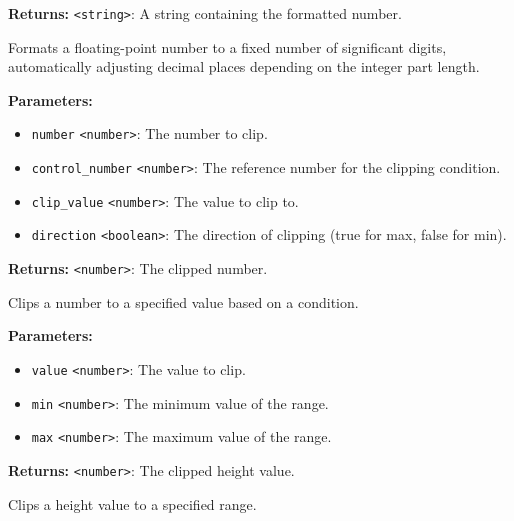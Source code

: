 \documentclass[12pt,a4paper]{article}
\begin{document}
\noindent \textbf{Returns:} \texttt{<string>}: A string containing the formatted number.

\noindent Formats a floating-point number to a fixed number of significant digits,
automatically adjusting decimal places depending on the integer part length.

\vspace{5mm}
\noindent {}


\noindent \textbf{Parameters:}
\begin{itemize}
  \item \texttt{number} \texttt{<number>}: The number to clip.
  \item \texttt{control\_number} \texttt{<number>}: The reference number for the clipping condition.
  \item \texttt{clip\_value} \texttt{<number>}: The value to clip to.
  \item \texttt{direction} \texttt{<boolean>}: The direction of clipping (true for max, false for min).
\end{itemize}

\noindent \textbf{Returns:} \texttt{<number>}: The clipped number.

\noindent Clips a number to a specified value based on a condition.

\vspace{5mm}
\noindent {}


\noindent \textbf{Parameters:}
\begin{itemize}
  \item \texttt{value} \texttt{<number>}: The value to clip.
  \item \texttt{min} \texttt{<number>}: The minimum value of the range.
  \item \texttt{max} \texttt{<number>}: The maximum value of the range.
\end{itemize}

\noindent \textbf{Returns:} \texttt{<number>}: The clipped height value.

\noindent Clips a height value to a specified range.

\vspace{5mm}
\noindent {}
\end{document}
